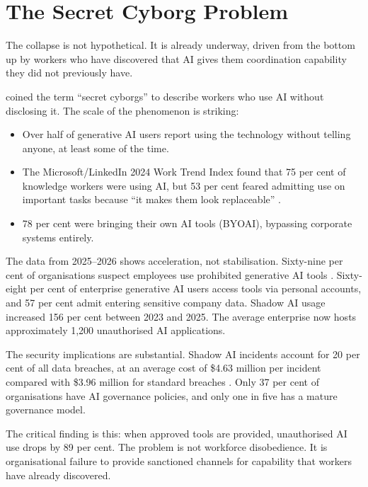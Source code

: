 \section{The Secret Cyborg Problem}

The collapse is not hypothetical. It is already underway, driven from the bottom up by workers who have discovered that AI gives them coordination capability they did not previously have.

\begin{evidencebox}[title={The Scale of Shadow AI Adoption}]
\textcite{Mollick2023SecretCyborgs} coined the term ``secret cyborgs'' to describe workers who use AI without disclosing it. The scale of the phenomenon is striking:
\begin{itemize}
  \item Over half of generative AI users report using the technology without telling anyone, at least some of the time.
  \item The Microsoft/LinkedIn 2024 Work Trend Index found that 75 per cent of knowledge workers were using AI, but 53 per cent feared admitting use on important tasks because ``it makes them look replaceable'' \parencite{MicrosoftWorkTrend2024}.
  \item 78 per cent were bringing their own AI tools (BYOAI), bypassing corporate systems entirely.
\end{itemize}
\end{evidencebox}

The data from 2025--2026 shows acceleration, not stabilisation. Sixty-nine per cent of organisations suspect employees use prohibited generative AI tools \parencite{Gartner2025}. Sixty-eight per cent of enterprise generative AI users access tools via personal accounts, and 57 per cent admit entering sensitive company data. Shadow AI usage increased 156 per cent between 2023 and 2025. The average enterprise now hosts approximately 1,200 unauthorised AI applications.

The security implications are substantial. Shadow AI incidents account for 20 per cent of all data breaches, at an average cost of \$4.63 million per incident compared with \$3.96 million for standard breaches \parencite{IBM2025}. Only 37 per cent of organisations have AI governance policies, and only one in five has a mature governance model.

\begin{keyinsight}
The critical finding is this: when approved tools are provided, unauthorised AI use drops by 89 per cent. The problem is not workforce disobedience. It is organisational failure to provide sanctioned channels for capability that workers have already discovered.
\end{keyinsight}

